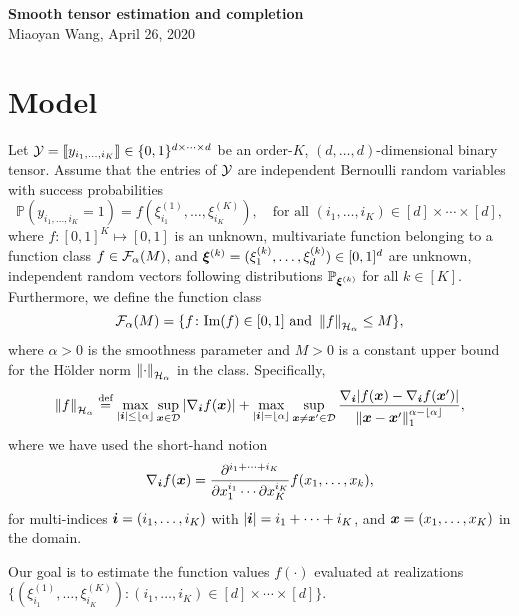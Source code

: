 \documentclass[11pt]{article}
\theoremstyle{plain}
\theoremstyle{definition}
\newcommand{\Hnorm}[1]{\left\lVert#1\right\rVert_{\tH_\alpha}}
\begin{document}
\begin{center}
{\bf \Large Smooth tensor estimation and completion}\\
Miaoyan Wang, April 26, 2020
\end{center}
\section{Model}

Let $\mathcal{Y}=\llbracket y_{i_1,\ldots,i_K} \rrbracket\in\{0,1\}^{d \times \cdots \times d}$ be an order-$K$, $(d,\ldots,d)$-dimensional binary tensor. Assume that the entries of $\mathcal{Y}$ are independent Bernoulli random variables with success probabilities
\[
\mathbb{P}(y_{i_1,\ldots,i_K}=1)=f(\xi^{(1)}_{i_1},\ldots,\xi^{(K)}_{i_K}),\quad \text{for all } (i_1,\ldots,i_K)\in[d]\times \cdots \times [d],
\]
where $f\colon [0,1]^K\mapsto [0,1]$ is an unknown, multivariate function belonging to a function class $f\in \mathcal{F}_\alpha(M)$, and $\boldsymbol{\xi}^{(k)}=(\xi^{(k)}_1,\ldots,\xi^{(k)}_d)\in[0,1]^d$ are unknown, independent random vectors following distributions $\mathbb{P}_{\boldsymbol{\xi}^{(k)}}$ for all $k\in[K]$. Furthermore, we define the function class
 \[ 
\tF_\alpha(M)=\{f\colon \text{Im}(f)\in[0,1]\ \text{and}\ \Hnorm{f}\leq M\},
\]
where $\alpha>0$ is the smoothness parameter and $M>0$ is a constant upper bound for the H\"{o}lder norm $\Hnorm{\cdot}$ in the class. Specifically, 
\[
\Hnorm{f}\stackrel{\text{def}}{=}\max_{|\mi|\leq \lfloor \alpha \rfloor}\sup_{\mx \in \tD} |\nabla_{\mi} f(\mx)|+\max_{|\mi| =\lfloor \alpha \rfloor}\sup_{\mx\neq \mx' \in \tD} {\nabla_{\mi} |f(\mx)-\nabla_{\mi} f(\mx')|\over \onenorm{\mx-\mx'}^{\alpha-\lfloor \alpha \rfloor}},
\]
where we have used the short-hand notion
\[
 \nabla_{\bm{i}} f(\bm x) ={\partial^{i_1+\cdots+i_K}\over \partial x^{i_1}_1\cdots \partial x^{i_K}_K} f(x_1,\ldots,x_k),
\]
for multi-indices $\bm{i}=(i_1,\ldots,i_K)$ with $|\bm{i}|=i_1+\cdots+i_K$, and $\bm x=(x_1,\ldots,x_K)$ in the domain.

Our goal is to estimate the function values $f(\cdot)$ evaluated at realizations $\{ (\xi^{(1)}_{i_1},\ldots,\xi^{(K)}_{i_K})\colon (i_1,\ldots,i_K)\in[d]\times \cdots \times [d]\}$. 


\end{document}
